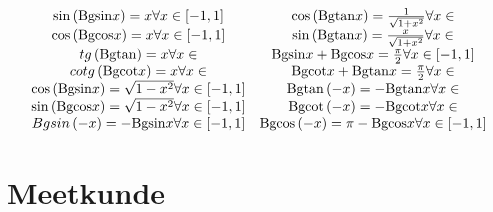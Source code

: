 \documentclass[a5paper]{article}
\begin{document}
{\[\begin{array}{*{20}{c}}
{\sin \left( {{\mathop{\rm Bgsin}\nolimits} x} \right) = x\forall x \in \left[ { - 1,1} \right]}&{\cos \left( {{\mathop{\rm Bgtan}\nolimits} x} \right) = \frac{1}{{\sqrt {1 + {x^2}} }}\forall x \in }\\
{\cos \left( {{\mathop{\rm Bgcos}\nolimits} x} \right) = x\forall x \in \left[ { - 1,1} \right]}&{\sin \left( {{\mathop{\rm Bgtan}\nolimits} x} \right) = \frac{x}{{\sqrt {1 + {x^2}} }}\forall x \in }\\
{tg\left( {{\mathop{\rm Bgtan}\nolimits} } \right) = x\forall x \in }&{{\mathop{\rm Bgsin}\nolimits} x + {\mathop{\rm Bgcos}\nolimits} x = \frac{\pi }{2}\forall x \in \left[ { - 1,1} \right]}\\
{cotg\left( {{\mathop{\rm Bgcot}\nolimits} x} \right) = x\forall x \in }&{{\mathop{\rm Bgcot}\nolimits} x + {\mathop{\rm Bgtan}\nolimits} x = \frac{\pi }{2}\forall x \in }\\
{\cos \left( {{\mathop{\rm Bgsin}\nolimits} x} \right) = \sqrt {1 - {x^2}} \forall x \in \left[ { - 1,1} \right]}&{{\mathop{\rm Bgtan}\nolimits} \left( { - x} \right) =  - {\mathop{\rm Bgtan}\nolimits} x\forall x \in }\\
{\sin \left( {{\mathop{\rm Bgcos}\nolimits} x} \right) = \sqrt {1 - {x^2}} \forall x \in \left[ { - 1,1} \right]}&{{\mathop{\rm Bgcot}\nolimits} \left( { - x} \right) =  - {\mathop{\rm Bgcot}\nolimits} x\forall x \in }\\
{Bgsin\left( { - x} \right) =  - {\mathop{\rm Bgsin}\nolimits} x\forall x \in \left[ { - 1,1} \right]}&{{\mathop{\rm Bgcos}\nolimits} \left( { - x} \right) = \pi  - {\mathop{\rm Bgcos}\nolimits} x\forall x \in \left[ { - 1,1} \right]}
\end{array}\]

\newpage

\section{Meetkunde}

}
\end{document}
